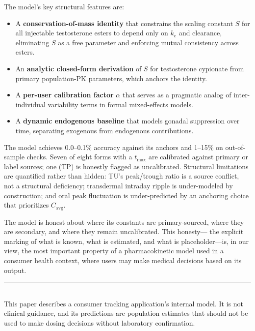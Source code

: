 \documentclass[11pt,a4paper]{article}
\begin{document}
The model's key structural features are:
\begin{itemize}[nosep,leftmargin=1.4em]
\item A \textbf{conservation-of-mass identity} that constrains the
  scaling constant $S$ for all injectable testosterone esters to depend
  only on $k_e$ and clearance, eliminating $S$ as a free parameter and
  enforcing mutual consistency across esters.
\item An \textbf{analytic closed-form derivation} of $S$ for
  testosterone cypionate from primary population-PK parameters, which
  anchors the identity.
\item A \textbf{per-user calibration factor} $\alpha$ that serves as a
  pragmatic analog of inter-individual variability terms in formal
  mixed-effects models.
\item A \textbf{dynamic endogenous baseline} that models gonadal
  suppression over time, separating exogenous from endogenous
  contributions.
\end{itemize}

The model achieves 0.0--0.1\% accuracy against its anchors and 1--15\%
on out-of-sample checks. Seven of eight forms with a $t_{\max}$ are
calibrated against primary or label sources; one (TP) is honestly
flagged as uncalibrated. Structural limitations are quantified rather
than hidden: TU's peak/trough ratio is a source conflict, not a
structural deficiency; transdermal intraday ripple is under-modeled by
construction; and oral peak fluctuation is under-predicted by an
anchoring choice that prioritizes $C_{\mathrm{avg}}$.

The model is honest about where its constants are primary-sourced, where
they are secondary, and where they remain uncalibrated. This honesty---
the explicit marking of what is known, what is estimated, and what is
placeholder---is, in our view, the most important property of a
pharmacokinetic model used in a consumer health context, where users
may make medical decisions based on its output.

\vfill
\noindent\rule{\linewidth}{0.4pt}\\[0.3em]
{\footnotesize This paper describes a consumer tracking application's
internal model. It is not clinical guidance, and its predictions are
population estimates that should not be used to make dosing decisions
without laboratory confirmation.}
\end{document}
